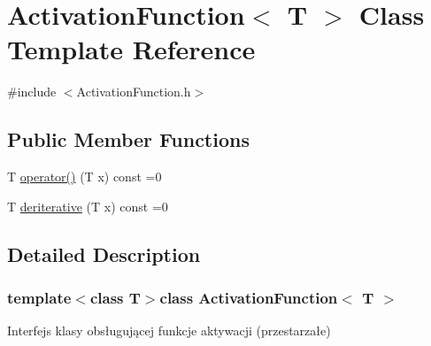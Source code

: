 \hypertarget{class_activation_function}{\section{\-Activation\-Function$<$ \-T $>$ \-Class \-Template \-Reference}
\label{class_activation_function}
}


{\ttfamily \#include $<$\-Activation\-Function.\-h$>$}

\subsection*{\-Public \-Member \-Functions}
\begin{DoxyCompactItemize}
\item 
\-T \hyperlink{class_activation_function_a34df0907340f36e41d5a1fd60a015036}{operator()} (\-T x) const =0
\item 
\-T \hyperlink{class_activation_function_a6916cffe74a85a7737b032e8977d3192}{deriterative} (\-T x) const =0
\end{DoxyCompactItemize}


\subsection{\-Detailed \-Description}
\subsubsection*{template$<$class T$>$class Activation\-Function$<$ T $>$}

\-Interfejs klasy obsługującej funkcje aktywacji (przestarzałe) 

